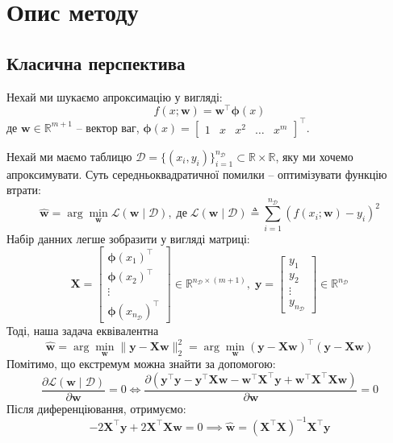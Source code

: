\documentclass[12pt]{extarticle}
\begin{document}
\pagebreak
\section{Опис методу}

\subsection{Класична перспектива}\label{section:classical_method}
Нехай ми шукаємо апроксимацію у вигляді:
\[
f(x;\mathbf{w}) = \mathbf{w}^{\top}\boldsymbol{\phi}(x)
\]
де $\mathbf{w} \in \mathbb{R}^{m+1}$ -- вектор ваг, $\boldsymbol{\phi}(x) = \begin{bmatrix}
    1 & x & x^2 & \dots & x^m
\end{bmatrix}^{\top}$. 

Нехай ми маємо таблицю $\mathcal{D} = \{(x_i,y_i)\}_{i=1}^{n_{\mathcal{D}}} \subset \mathbb{R} \times \mathbb{R}$, яку ми хочемо апроксимувати.
Суть середньоквадратичної помилки -- оптимізувати функцію втрати:
\[
\hat{\mathbf{w}} = \arg\min_{\mathbf{w}}\mathcal{L}(\mathbf{w} \mid \mathcal{D}), \; \text{де} \; \mathcal{L}(\mathbf{w} \mid \mathcal{D}) \triangleq \sum_{i=1}^{n_{\mathcal{D}}} (f(x_i;\mathbf{w}) - y_i)^2
\]
Набір данних легше зобразити у вигляді матриці:
\[
\mathbf{X} = \begin{bmatrix}
    \boldsymbol{\phi}(x_1)^{\top} \\
    \boldsymbol{\phi}(x_2)^{\top} \\
    \vdots \\
    \boldsymbol{\phi}(x_{n_{\mathcal{D}}})^{\top}
\end{bmatrix} \in \mathbb{R}^{n_{\mathcal{D}} \times (m+1)}, \; \mathbf{y} = \begin{bmatrix}
    y_1 \\ y_2 \\ \vdots \\ y_{n_{\mathcal{D}}}
\end{bmatrix} \in \mathbb{R}^{n_{\mathcal{D}}}
\]
Тоді, наша задача еквівалентна
\[
\hat{\mathbf{w}} = \arg\min_{\mathbf{w}}\|\mathbf{y} - \mathbf{X}\mathbf{w}\|_2^2 = \arg\min_{\mathbf{w}}(\mathbf{y}-\mathbf{Xw})^{\top}(\mathbf{y}-\mathbf{Xw})
\]
Помітимо, що екстремум можна знайти за допомогою:
\[
\frac{\partial\mathcal{L}(\mathbf{w} \mid \mathcal{D})}{\partial \mathbf{w}} = 0 \iff \frac{\partial(\mathbf{y}^{\top}\mathbf{y} - \mathbf{y}^{\top}\mathbf{X}\mathbf{w}-\mathbf{w}^{\top}\mathbf{X}^{\top}\mathbf{y} + \mathbf{w}^{\top}\mathbf{X}^{\top}\mathbf{X}\mathbf{w})}{\partial\mathbf{w}}=0
\]
Після диференціювання, отримуємо:
\[
-2\mathbf{X}^{\top}\mathbf{y} + 2\mathbf{X}^{\top}\mathbf{Xw} = 0 \implies \boxed{\hat{\mathbf{w}} = (\mathbf{X}^{\top}\mathbf{X})^{-1}\mathbf{X}^{\top}\mathbf{y}} 
\]
\end{document}
